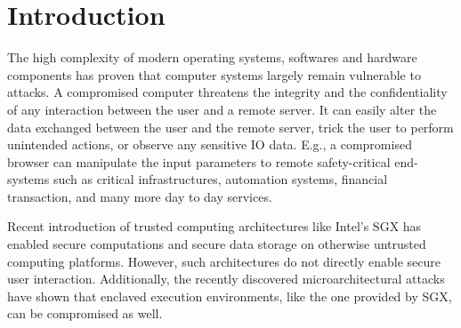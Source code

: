 \section{Introduction}
\label{sec:intro}

The high complexity of modern operating systems, softwares and hardware components has proven that computer systems largely remain vulnerable to attacks. A compromised computer threatens the integrity and the confidentiality of any interaction between the user and a remote server. It can easily alter the data exchanged between the user and the remote server, trick the user to perform unintended actions, or observe any sensitive IO data. E.g., a compromised browser can manipulate the input parameters to remote safety-critical end-systems such as critical infrastructures, automation systems, financial transaction, and many more day to day services.

Recent introduction of trusted computing architectures like Intel's SGX has enabled secure computations and secure data storage on otherwise untrusted computing platforms. However, such architectures do not directly enable secure user interaction. Additionally, the recently discovered microarchitectural attacks have shown that enclaved execution environments, like the one provided by SGX, can be compromised as well.

\iffalse
\begin{figure}[t]
\centering
\texttt{[image: motivation.pdf]}
\caption{\textbf{Motivating examples.} 1) Pointer based UI elements that sets parameters to remote safety-critical device, 2) E-voting where the voting privacy and integrity is critical, 3) Financial transactions such as bitcoin wallet that shows sensitive information such as the user's private key and 4) web applications that provide an option for the user to reveal credentials.}
\spacesave
\label{fig:motivation}
\centering
\end{figure}
\fi

